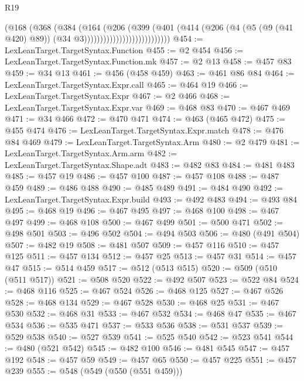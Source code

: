 \begin{lexlean}{R19}
\begin{coremodule}
                                    (@168
                                      (@368
                                        (@384
                                          (@164
                                            (@206
                                              (@399
                                                (@401
                                                  (@414
                                                    (@206
                                                      (@4
                                                        (@5 (@9 (@41 @420) @89))
                                                        (@34 @3)))))))))))))))))))))))))))
@454 := LexLeanTarget.TargetSyntax.Function
@455 := @2 @454
@456 := LexLeanTarget.TargetSyntax.Function.mk
@457 := @2 @13
@458 := @457 @83
@459 := @34 @13
@461 := @456 (@458 @459)
@463 := @461 @86 @84
@464 := LexLeanTarget.TargetSyntax.Expr.call
@465 := @464 @19
@466 := LexLeanTarget.TargetSyntax.Expr
@467 := @2 @466
@468 := LexLeanTarget.TargetSyntax.Expr.var
@469 := @468 @83
@470 := @467 @469
@471 := @34 @466
@472 := @470 @471
@474 := @463 (@465 @472)
@475 := @455 @474
@476 := LexLeanTarget.TargetSyntax.Expr.match
@478 := @476 @84 @469
@479 := LexLeanTarget.TargetSyntax.Arm
@480 := @2 @479
@481 := LexLeanTarget.TargetSyntax.Arm.arm
@482 := LexLeanTarget.TargetSyntax.Shape.adt
@483 := @482 @83
@484 := @481 @483
@485 := @457 @19
@486 := @457 @100
@487 := @457 @108
@488 := @487 @459
@489 := @486 @488
@490 := @485 @489
@491 := @484 @490
@492 := LexLeanTarget.TargetSyntax.Expr.build
@493 := @492 @483
@494 := @493 @84
@495 := @468 @19
@496 := @467 @495
@497 := @468 @100
@498 := @467 @497
@499 := @468 @108
@500 := @467 @499
@501 := @500 @471
@502 := @498 @501
@503 := @496 @502
@504 := @494 @503
@506 := @480 (@491 @504)
@507 := @482 @19
@508 := @481 @507
@509 := @457 @116
@510 := @457 @125
@511 := @457 @134
@512 := @457 @25
@513 := @457 @31
@514 := @457 @47
@515 := @514 @459
@517 := @512 (@513 @515)
@520 := @509 (@510 (@511 @517))
@521 := @508 @520
@522 := @492 @507
@523 := @522 @84
@524 := @468 @116
@525 := @467 @524
@526 := @468 @125
@527 := @467 @526
@528 := @468 @134
@529 := @467 @528
@530 := @468 @25
@531 := @467 @530
@532 := @468 @31
@533 := @467 @532
@534 := @468 @47
@535 := @467 @534
@536 := @535 @471
@537 := @533 @536
@538 := @531 @537
@539 := @529 @538
@540 := @527 @539
@541 := @525 @540
@542 := @523 @541
@544 := @480 (@521 @542)
@545 := @482 @100
@546 := @481 @545
@547 := @457 @192
@548 := @457 @59
@549 := @457 @65
@550 := @457 @225
@551 := @457 @239
@555 := @548 (@549 (@550 (@551 @459)))

\end{coremodule}
\end{lexlean}
